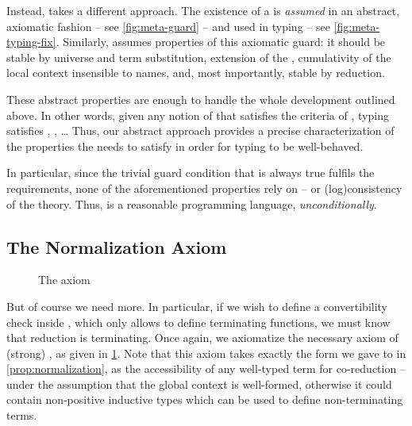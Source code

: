 Instead,  takes a different approach. The existence of a  is
\emph{assumed} in an abstract, axiomatic fashion – see \cref{fig:meta-guard} –
and used in typing – see \cref{fig:meta-typing-fix}.
Similarly,  assumes properties of this axiomatic guard: it
should be stable by universe and term substitution, extension of the ,
cumulativity of the local context insensible to names, and, most importantly, stable by
reduction.

These abstract properties are enough to handle the whole development outlined above. In other
words, given any notion of  that satisfies the criteria of
, typing satisfies ,
, … Thus, our abstract approach provides a precise
characterization of the properties the  needs to satisfy in order
for typing to be well-behaved.

In particular, since the trivial guard condition
that is always true fulfils the requirements, none of the aforementioned
properties rely on  – or \kl(log){consistency} of the theory.
Thus,  is a reasonable programming language, \emph{unconditionally}.

\subsection{The Normalization Axiom}

\begin{figure}[h]
  \caption{The  axiom}
  \label{fig:meta-sn}
\end{figure}

But of course we need more. In particular, if we wish to define a convertibility check
inside , which only allows to define terminating functions,
we must know that reduction is terminating. Once again, we axiomatize the necessary
axiom of (strong) , as given in \cref{fig:meta-sn}.
Note that this axiom takes exactly the form we gave to 
in \cref{prop:normalization}, as the accessibility of any well-typed term for
co-reduction – under the assumption that the global context is well-formed, otherwise
it could contain \eg non-positive inductive types which can be used to define non-terminating terms.

